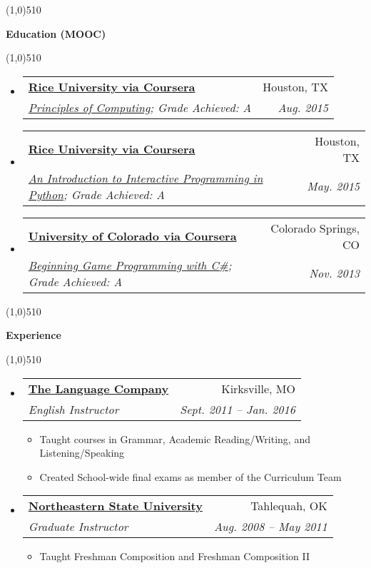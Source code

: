 \documentclass[letterpaper,11pt]{article}
\makeatletter
\newcommand{\resitem}[1]{\item #1 \vspace{-2pt}}
\newcommand{\resheading}[1]{{\large {\begin{minipage}{\textwidth}{\textbf{#1 \vphantom{p\^{E}}}}\end{minipage}}}}
\newcommand{\ressubheading}[4]{
\begin{tabular*}{6.5in}{l@{\extracolsep{\fill}}r}
		\textbf{#1} & #2 \\
		\textit{#3} & \textit{#4} \\
\end{tabular*}\vspace{-6pt}}
\makeatother
\begin{document}

\line(1,0){510}

\resheading{Education (MOOC)}

\line(1,0){510}

	\begin{itemize}
	\item
		\ressubheading {\href{http://www.rice.edu/}{Rice University via Coursera}}{Houston, TX}{\href{http://www.codeskulptor.org/coursera/principlescomputing.html}{Principles of Computing};  {Grade Achieved: A}}{Aug. 2015}
	\item	
		\ressubheading {\href{http://www.rice.edu/}{Rice University via Coursera}}{Houston, TX}{\href{http://www.codeskulptor.org/coursera/interactivepython.html}{An Introduction to Interactive Programming in Python};  {Grade Achieved: A}}{May. 2015}
	\item	
		\ressubheading {\href{http://www.uccs.edu/}{University of Colorado via Coursera}}{Colorado Springs, CO}{\href{https://www.coursera.org/course/gameprogramming}{Beginning Game Programming with C\#};  {Grade Achieved: A}}{Nov. 2013}			
	\end{itemize}

\line(1,0){510}

\resheading{Experience}

\line(1,0){510}
	\begin{itemize}
		\item 
			\ressubheading{\href{http://www.thelanguagecompany.com}{The Language Company }}{Kirksville, MO}
				{English Instructor}{Sept. 2011 -- Jan. 2016}
				{ \footnotesize
				\begin{itemize}
					\resitem{Taught courses in Grammar, Academic Reading/Writing, and Listening/Speaking}
					\resitem{Created School-wide final exams as member of the Curriculum Team}
				\end{itemize}
				}
		\item
			\ressubheading{\href{http://www.nsuok.edu}{Northeastern State University}}{Tahlequah, OK}
				{Graduate Instructor}{Aug. 2008 -- May 2011}
				{ \footnotesize
				\begin{itemize}
					\resitem{Taught Freshman Composition and Freshman Composition II}
				\end{itemize}
				}

			

	\end{itemize}  %
\end{document}
